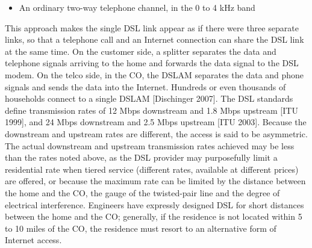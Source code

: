 \documentclass{article}
\begin{document}
\begin{description}
\begin{itemize}
        \item An ordinary two-way telephone channel, in the 0 to 4 kHz band
    \end{itemize}
    This approach makes the single DSL link appear as if there were three separate
    links, so that a telephone call and an Internet connection can share the DSL link at
    the same time. On the customer side, a splitter separates the data and telephone signals
    arriving to the home and forwards the data signal to the DSL modem. On the
    telco side, in the CO, the DSLAM separates the data and phone signals and sends
    the data into the Internet. Hundreds or even thousands of households connect to a
    single DSLAM [Dischinger 2007]. The DSL standards define transmission rates of 12 Mbps downstream and
    1.8 Mbps upstream [ITU 1999], and 24 Mbps downstream and 2.5 Mbps upstream
    [ITU 2003]. Because the downstream and upstream rates are different, the access is
    said to be asymmetric. The actual downstream and upstream transmission rates
    achieved may be less than the rates noted above, as the DSL provider may purposefully
    limit a residential rate when tiered service (different rates, available at different
    prices) are offered, or because the maximum rate can be limited by the distance
    between the home and the CO, the gauge of the twisted-pair line and the degree of
    electrical interference. Engineers have expressly designed DSL for short distances
    between the home and the CO; generally, if the residence is not located within 5 to 10
    miles of the CO, the residence must resort to an alternative form of Internet access.


\end{description}
\end{document}
